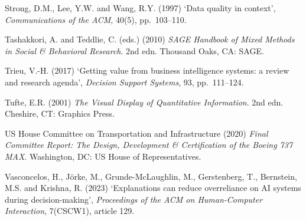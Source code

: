 \documentclass[11pt,a4paper]{article}
\numberwithin{figure}{section}
\numberwithin{table}{section}
\begin{document}
{\noindent\hypertarget{ref67}{}\begin{minipage}[t]{\dimexpr\linewidth-1.05cm\relax}Strong, D.M., Lee, Y.W. and Wang, R.Y. (1997) `Data quality in context', \emph{Communications of the ACM}, 40(5), pp.~103--110.\end{minipage}\par\vspace{4pt}
\noindent\hypertarget{ref68}{}\begin{minipage}[t]{\dimexpr\linewidth-1.05cm\relax}Tashakkori, A. and Teddlie, C. (eds.) (2010) \emph{SAGE Handbook of Mixed Methods in Social \& Behavioral Research}. 2nd edn. Thousand Oaks, CA: SAGE.\end{minipage}\par\vspace{4pt}
\noindent\hypertarget{ref69}{}\begin{minipage}[t]{\dimexpr\linewidth-1.05cm\relax}Trieu, V.-H. (2017) `Getting value from business intelligence systems: a review and research agenda', \emph{Decision Support Systems}, 93, pp.~111--124.\end{minipage}\par\vspace{4pt}
\noindent\hypertarget{ref70}{}\begin{minipage}[t]{\dimexpr\linewidth-1.05cm\relax}Tufte, E.R. (2001) \emph{The Visual Display of Quantitative Information}. 2nd edn. Cheshire, CT: Graphics Press.\end{minipage}\par\vspace{4pt}
\noindent\hypertarget{ref71}{}\begin{minipage}[t]{\dimexpr\linewidth-1.05cm\relax}US House Committee on Transportation and Infrastructure (2020) \emph{Final Committee Report: The Design, Development \& Certification of the Boeing 737 MAX}. Washington, DC: US House of Representatives.\end{minipage}\par\vspace{4pt}
\noindent\hypertarget{ref72}{}\begin{minipage}[t]{\dimexpr\linewidth-1.05cm\relax}Vasconcelos, H., J\"{o}rke, M., Grunde-McLaughlin, M., Gerstenberg, T., Bernstein, M.S. and Krishna, R. (2023) `Explanations can reduce overreliance on AI systems during decision-making', \emph{Proceedings of the ACM on Human-Computer Interaction}, 7(CSCW1), article 129.\end{minipage}\par\vspace{4pt}
}
\end{document}
